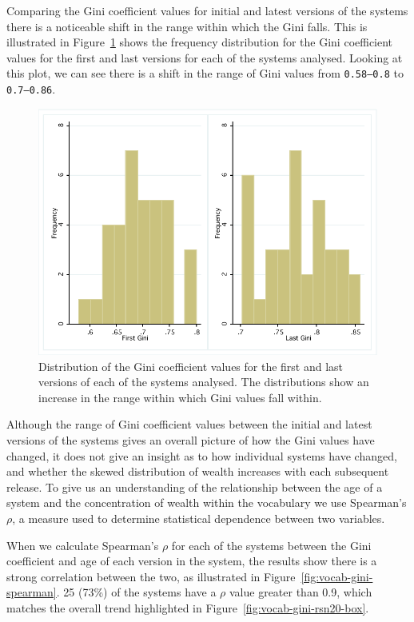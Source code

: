 Comparing the Gini coefficient values for initial and latest versions of the systems there is a noticeable shift in the range within which the Gini falls. This is illustrated in Figure~\ref{fig:vocab-firstlastgini-dist} shows the frequency distribution for the Gini coefficient values for the first and last versions for each of the systems analysed. Looking at this plot, we can see there is a shift in the range of Gini values from \texttt{0.58--0.8} to \texttt{0.7--0.86}.

\begin{figure}[t]
\centering
\includegraphics[width=\textwidth]{Figures/Vocab-FirstLastGini.pdf}
\caption{Distribution of the Gini coefficient values for the first and last versions of each of the systems analysed. The distributions show an increase in the range within which Gini values fall within.}
\label{fig:vocab-firstlastgini-dist}
\end{figure}

Although the range of Gini coefficient values between the initial and latest versions of the systems gives an overall picture of how the Gini values have changed, it does not give an insight as to how individual systems have changed, and whether the skewed distribution of wealth increases with each subsequent release. To give us an understanding of the relationship between the age of a system and the concentration of wealth within the vocabulary we use Spearman's $\rho$, a measure used to determine statistical dependence between two variables.

When we calculate Spearman's $\rho$ for each of the systems between the Gini  coefficient and age of each version in the system, the results show there is a strong correlation between the two, as illustrated in Figure~\ref{fig:vocab-gini-spearman}. 25 (73\%) of the systems have a $\rho$ value greater than 0.9, which matches the overall trend highlighted in Figure~\ref{fig:vocab-gini-rsn20-box}.

